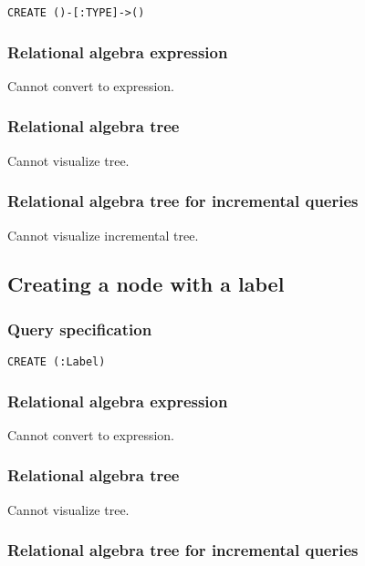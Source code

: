 \begin{lstlisting}
CREATE ()-[:TYPE]->()
\end{lstlisting}

\subsubsection*{Relational algebra expression}

Cannot convert to expression.

\subsubsection*{Relational algebra tree}

Cannot visualize tree.

\subsubsection*{Relational algebra tree for incremental queries}

Cannot visualize incremental tree.

\subsection{Creating a node with a label}

\subsubsection*{Query specification}

\begin{lstlisting}
CREATE (:Label)
\end{lstlisting}

\subsubsection*{Relational algebra expression}

Cannot convert to expression.

\subsubsection*{Relational algebra tree}

Cannot visualize tree.

\subsubsection*{Relational algebra tree for incremental queries}

